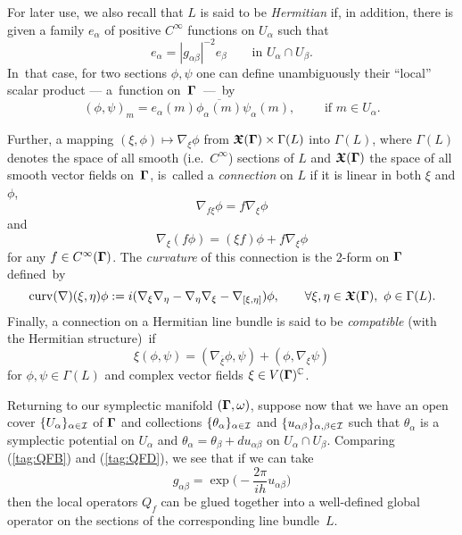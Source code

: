 \documentclass[11pt]{amsart}
\numberwithin{equation}{section}
\theoremstyle{remark}
\newcommand\Omg{{\bigam}}   %
\newcommand\curv{\operatorname{curv}}
\newcommand{\CC}{\C}
\newcommand{\bigam}{\mbox{\boldmath $\Gamma$}}
\newcommand{\bfrakX}{\mbox{\boldmath $\mathfrak X$}}
\newcommand{\C}{\mathbb C}
\begin{document}
For later use, we also recall that $L$ is said to be {\sl Hermitian\/} if, in
addition, there is given a family $e_\alpha$ of positive $C^\infty$ functions
on $U_\alpha$ such that
$$ e_\alpha = |g_{\alpha\beta}|^{-2} e_\beta \qquad
\text{in }U_\alpha\cap U_\beta.  $$
In~that case, for two sections $\phi,\psi$ one can define unambiguously their
``local'' scalar product --- a~function on~$\Omg$~---~by
$$ (\phi,\psi)_m = e_\alpha(m) \overline{\phi_\alpha(m)}\psi_\alpha(m),
\qquad\text{ if } m\in U_\alpha.  $$

Further, a mapping $(\xi,\phi)\mapsto\nabla_\xi \phi$ from $\bfrakX(\Omg)\times
\Gamma(L)$ into $\Gamma(L)$, where $\Gamma(L)$ denotes the space of all smooth
(i.e.~$C^\infty$) sections of $L$ and $\bfrakX(\Omg)$ the space of all smooth
vector fields on~$\Omg$, is~called a {\sl connection\/} on $L$ if it is linear
in both $\xi$ and $\phi$,
\begin{equation}  \nabla_{f\xi}\phi=f \nabla_\xi\phi  \label{tag:QFEa}
\end{equation}
and
\begin{equation}  \nabla_\xi (f\phi) = (\xi f)\phi + f\nabla_\xi \phi
\label{tag:QFEb}  \end{equation}
for any $f\in C^\infty(\Omg)$. The {\sl curvature\/} of this connection is the
2-form on $\Omg$ defined~by
\begin{equation}  \curv(\nabla)(\xi,\eta)\phi := i(\nabla_\xi
\nabla_\eta-\nabla_\eta \nabla_\xi -\nabla_{[\xi,\eta]} ) \phi, \qquad \forall
\xi,\eta\in \bfrakX(\Omg),\ \phi\in\Gamma(L).  \label{tag:QFEc} \end{equation}
Finally, a connection on a Hermitian line bundle is said to be {\sl
compatible\/} (with the Hermitian structure)~if
\begin{equation}  \xi (\phi,\psi) = (\nabla_{\overline\xi} \phi,\psi) +
(\phi,\nabla_\xi \psi)  \label{tag:QFF}  \end{equation}
for $\phi,\psi\in\Gamma(L)$ and complex vector fields $\xi\in V(\Omg)^\CC$.

Returning to our symplectic manifold $(\Omg,\omega)$, suppose now that we have
an open cover $\{U_\alpha\}_{\alpha\in\mathcal I}$ of $\Omg$ and collections
$\{\theta_ \alpha\}_{\alpha\in\mathcal I}$ and
$\{u_{\alpha\beta}\}_{\alpha,\beta\in\mathcal I}$
such that $\theta_\alpha$ is a symplectic potential on $U_\alpha$ and $\theta_
\alpha=\theta_\beta+du_{\alpha\beta}$ on $U_\alpha\cap U_\beta$. Comparing
(\ref{tag:QFB}) and (\ref{tag:QFD}), we see that if we can take
\begin{equation}  g_{\alpha\beta}=\exp\Big(-\frac{2\pi}{ih}
u_{\alpha\beta}\Big)  \label{tag:QFG} \end{equation}
then the local operators $Q_f$ can be glued together into a well-defined global
operator on the sections of the corresponding line bundle~$L$.
\end{document}
